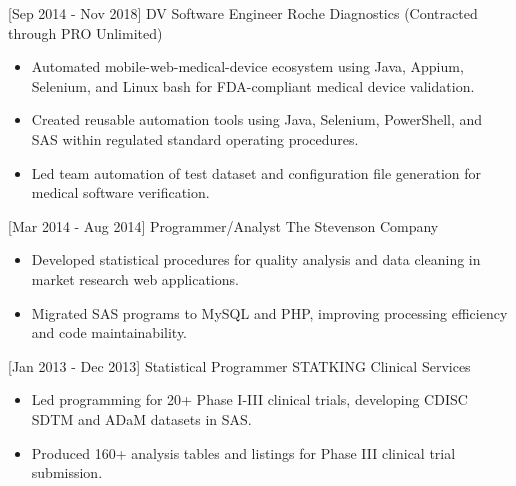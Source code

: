 \documentclass[]{moak-resume}
\begin{document}
\begin{entrylist}
  \entry
    {[Sep 2014 - Nov 2018]}
    {DV Software Engineer}
    {Roche Diagnostics (Contracted through PRO Unlimited)}
    {}
\end{entrylist}
\begin{itemize}
  \item \small\bodyfont Automated mobile-web-medical-device ecosystem using Java, Appium, Selenium, and Linux bash for FDA-compliant medical device validation.
  \item \small\bodyfont Created reusable automation tools using Java, Selenium, PowerShell, and SAS within regulated standard operating procedures.
  \item \small\bodyfont Led team automation of test dataset and configuration file generation for medical software verification.
\end{itemize}

\begin{entrylist}
  \entry
    {[Mar 2014 - Aug 2014]}
    {Programmer/Analyst}
    {The Stevenson Company}
    {}
\end{entrylist}
\begin{itemize}
  \item \small\bodyfont Developed statistical procedures for quality analysis and data cleaning in market research web applications.
  \item \small\bodyfont Migrated SAS programs to MySQL and PHP, improving processing efficiency and code maintainability.
\end{itemize}

\begin{entrylist}
    \entry
    {[Jan 2013 - Dec 2013]}
    {Statistical Programmer}
    {STATKING Clinical Services}
    {}
  \end{entrylist}
\begin{itemize}
  \item \small\bodyfont Led programming for 20+ Phase I-III clinical trials, developing CDISC SDTM and ADaM datasets in SAS.
  \item \small\bodyfont Produced 160+ analysis tables and listings for Phase III clinical trial submission.
\end{itemize}
\end{document}
